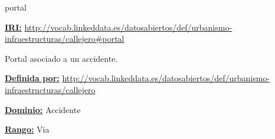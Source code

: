 





\begin{mybox}{portal}
\begin{flushleft}
\underline{\textbf{IRI:}}
\url{http://vocab.linkeddata.es/datosabiertos/def/urbanismo-infraestructuras/callejero#portal}
\newline

Portal asociado a un accidente.
\newline

\underline{\textbf{Definida por:}}\newline
\url{http://vocab.linkeddata.es/datosabiertos/def/urbanismo-infraestructuras/callejero}
\newline

\underline{\textbf{Dominio:}}		Accidente
\newline

\underline{\textbf{Rango:}}		Via

\end{flushleft}
\end{mybox}

































